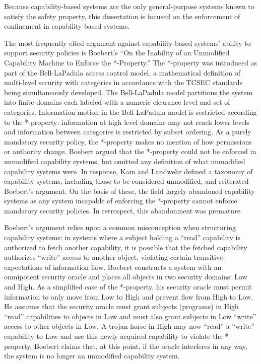Because capability-based systems are the only general-purpose systems known to satisfy the safety property, this dissertation is focused on the enforcement of confinement in capability-based systems.

The most frequently cited argument against capability-based systems' ability to support security policies is Boebert's ``On the Inability of an Unmodified Capability Machine to Enforce the *-Property.'' \cite{Boebert:Unmodified}
The *-property was introduced as part of the Bell-LaPadula access control model\cite{BellLaPadula}: a mathematical definition of multi-level security with categories in accordance with the TCSEC standards being simultaneously developed.\cite{TCSEC1985}
The Bell-LaPadula model partitions the system into finite domains each labeled with a numeric clearance level and set of categories.
Information motion in the Bell-LaPadula model is restricted according to the *-property: information at high level domains may not reach lower levels and information between categories is restricted by subset ordering.
As a purely mandatory security policy, the *-property makes no mention of how permissions or authority change.
Boebert argued that the *-property could not be enforced in unmodified capability systems, but omitted any definition of what unmodified capability systems were.
In response, Kain and Landwehr defined a taxonomy of capability systems, including those to be considered unmodified, and reiterated Boebert's argument. \cite{Kain87onaccess}
On the basis of these, the field largely abandoned capability systems as any system incapable of enforcing the *-property cannot enforce mandatory security policies.
In retrospect, this abandonment was premature.

Boebert's argument relies upon a common misconception when structuring capability systems:
in systems where a subject holding a  ``read'' capability is authorized to fetch another capability, it is possible that the fetched capability authorizes ``write'' access to another object, violating certain transitive expectations of information flow.
Boebert constructs a system with an omnipotent security oracle and places all objects in two security domains: Low and High.
As a simplified case of the *-property, his security oracle must permit information to only move from Low to High and prevent flow from High to Low.
He assumes that the security oracle must grant subjects (programs) in High ``read'' capabilities to objects in Low and must also grant subjects in Low ``write'' access to other objects in Low.
A trojan horse in High may now ``read'' a ``write'' capability to Low and use this newly acquired capability to violate the *-property.
Boebert claims that, at this point, if the oracle interferes in any way, the system is no longer an unmodified capability system.

